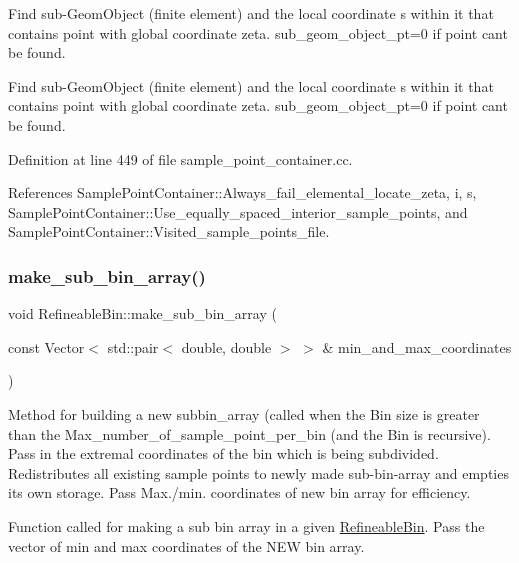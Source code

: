 Find sub-\/\+Geom\+Object (finite element) and the local coordinate s within it that contains point with global coordinate zeta. sub\+\_\+geom\+\_\+object\+\_\+pt=0 if point can\textquotesingle{}t be found. 

Find sub-\/\+Geom\+Object (finite element) and the local coordinate s within it that contains point with global coordinate zeta. sub\+\_\+geom\+\_\+object\+\_\+pt=0 if point can\textquotesingle{}t be found. 

Definition at line 449 of file sample\+\_\+point\+\_\+container.\+cc.



References Sample\+Point\+Container\+::\+Always\+\_\+fail\+\_\+elemental\+\_\+locate\+\_\+zeta, i, s, Sample\+Point\+Container\+::\+Use\+\_\+equally\+\_\+spaced\+\_\+interior\+\_\+sample\+\_\+points, and Sample\+Point\+Container\+::\+Visited\+\_\+sample\+\_\+points\+\_\+file.

\mbox{\label{classRefineableBin_a39cc753a17e800ef388c4cb1352ff0cf}} 
\subsubsection{\texorpdfstring{make\+\_\+sub\+\_\+bin\+\_\+array()}{make\_sub\_bin\_array()}}
{\footnotesize\ttfamily void Refineable\+Bin\+::make\+\_\+sub\+\_\+bin\+\_\+array (\begin{DoxyParamCaption}\item[{const Vector$<$ std\+::pair$<$ double, double $>$ $>$ \&}]{min\+\_\+and\+\_\+max\+\_\+coordinates }\end{DoxyParamCaption})\hspace{0.3cm}{\ttfamily [protected]}}



Method for building a new subbin\+\_\+array (called when the Bin size is greater than the Max\+\_\+number\+\_\+of\+\_\+sample\+\_\+point\+\_\+per\+\_\+bin (and the Bin is recursive). Pass in the extremal coordinates of the bin which is being subdivided. Redistributes all existing sample points to newly made sub-\/bin-\/array and empties its own storage. Pass Max./min. coordinates of new bin array for efficiency. 

Function called for making a sub bin array in a given \hyperlink{classRefineableBin}{Refineable\+Bin}. Pass the vector of min and max coordinates of the N\+EW bin array. 

